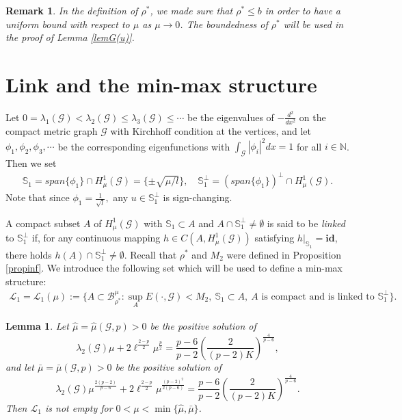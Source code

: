 \documentclass[10pt,a4paper]{article}
\newtheorem{lemma}[theorem]{Lemma}
\newtheorem{remark}[theorem]{Remark}
\theoremstyle{definition} \theoremstyle{remark}
\numberwithin{equation}{section}
\newcommand{\G}{\mathcal{G}}
\newcommand{\N}{\mathbb{N}}
\newcommand{\B}{\mathcal{B}}
\newcommand{\s}{\mathbb{S}}
\newcommand{\cl}{\mathcal{L}}
\newcommand{\la}{\lambda}
\begin{document}
\begin{remark}
	In the definition of $\rho^*$, we made sure that $\rho^* \leq b$ in order to have a uniform bound with respect to $\mu$ as $\mu \to 0$. The boundedness of $\rho^*$ will be used in the proof of Lemma \ref{lemG(u)}.
\end{remark}

\section{Link and the min-max structure} \label{seclink}

Let $0=\la_1(\G) < \la_2(\G) \leq \la_3(\G) \leq \cdots $ be the eigenvalues of $-\frac{d^2}{dx^2}$ on the compact metric graph $\G$ with Kirchhoff condition at the vertices, and let $\phi_1, \phi_2, \phi_3, \cdots$ be the corresponding eigenfunctions with $\int_\G|\phi_i|^2dx = 1$ for all $i \in \N$. Then we set
\begin{align*}
	\s_1 = span\{\phi_1\} \cap H^1_\mu(\G) = \{\pm \sqrt{\mu/l}\}, \quad \s_1^\perp = (span\{\phi_1\})^\perp \cap H^1_\mu(\G).
\end{align*}
Note that since $\phi_1 = \frac{1}{\sqrt{l}},$ any $u \in \s_1^\perp$ is sign-changing.
	
	A compact subset $A$ of $H^1_\mu(\G)$ with $\s_1 \subset A$ and $A \cap \mathbb{S}_{1}^\perp \not= \emptyset$ is said to be \textit{linked} to $\mathbb{S}_{1}^\perp$ if, for any continuous mapping $h \in C(A,H^1_\mu(\G))$ satisfying $h|_{\s_1} = \textbf{id}$, there holds $h(A) \cap \mathbb{S}_{1}^\perp \not= \emptyset$. Recall that $\rho^*$ and $M_2$ were defined in Proposition \ref{propinf}. We introduce the following set which will be used to define a min-max structure:
\begin{align} \label{eqdefl1}
	\cl_1 = \cl_1(\mu) := \bigl\{A \subset \B_{\rho^*}^\mu: \sup_A E(\cdot,\G) < M_2, \ \s_1 \subset A, \ A \text{ is compact and is linked to } \s_1^\perp\bigr\}.
\end{align}

\begin{lemma} \label{lemlnotemp}
    Let $\hat{\mu} = \hat{\mu}(\G,p) > 0$ be the positive solution of
    $$
    \la_2(\G)\mu + 2\ell^{\frac{2-p}2}\mu^{\frac p2} = \frac{p-6}{p-2}\left( \frac2{(p-2)K}\right)^{\frac4{p-6}},
    $$
    and let $\bar{\mu} = \bar{\mu}(\G,p) > 0$ be the positive solution of
    $$
    \la_2(\G)\mu^{\frac{2(p-2)}{p-6}} + 2\ell^{\frac{2-p}2}\mu^{\frac{(p-2)^2}{2(p-6)}} = \frac{p-6}{p-2}\left( \frac2{(p-2)K}\right)^{\frac4{p-6}}.
    $$
	Then $\cl_1$ is not empty for $0 < \mu < \min\{\hat{\mu},\bar{\mu}\}$.
\end{lemma}
\end{document}
